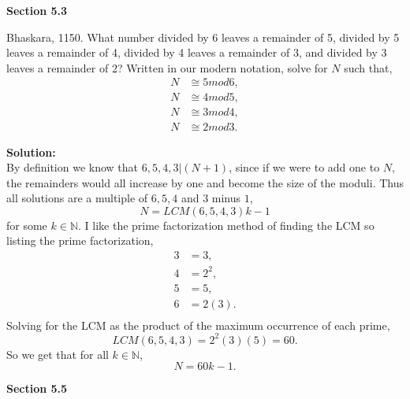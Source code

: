 \documentclass[12pt]{article}
\makeatletter
\theoremstyle{homework}
\newenvironment{exercise}[1]
{\def\@currentlabel{#1}\exercisecore}
{\endexercisecore}
\newcommand{\localhead}[1]{\par\smallskip\noindent\textbf{#1}\nobreak\\}%
\newcommand\solution{\localhead{Solution:}}
\newcommand{\Nats}{\ensuremath{\mathbb N}}
\makeatother
\begin{document}
\textbf{Section 5.3}

\begin{exercise}{21} Bhaskara, 1150. What number divided by 6 leaves a remainder of 5, divided by 5
  leaves a remainder of 4, divided by 4 leaves a remainder of 3, and divided by 3 leaves a remainder of 2? Written in our modern notation, solve for $N$ such that,
  \begin{align*}
    N &\cong 5 mod 6,\\
    N &\cong 4 mod 5,\\
    N &\cong 3 mod 4,\\
    N &\cong 2 mod 3.
  \end{align*}
  \solution By definition we know that $6,5,4,3|(N + 1)$, since if we were to add one to $N$, the remainders would all increase by one 
  and become the size of the moduli. Thus all solutions are a multiple of $6,5,4$ and $3$ minus $1$,
  \begin{equation*}
    N = LCM(6,5,4,3)k - 1 
  \end{equation*}
  for some $k \in \Nats$.
  I like the prime factorization method of finding the LCM so listing the prime factorization,
  \begin{align*}
    3 &= 3,\\
    4 &= 2^2,\\
    5 &= 5,\\
    6 &= 2(3).\\
  \end{align*} 
Solving for the LCM as the product of the maximum occurrence of each prime, 
\begin{equation*}
  LCM(6,5,4,3) = 2^2(3)(5) = 60.
\end{equation*}
So we get that for all $k \in \Nats$,
\begin{equation*}
  N = 60k - 1.
\end{equation*}
\end{exercise}
\vspace{.5in}


\textbf{Section 5.5}
\end{document}

